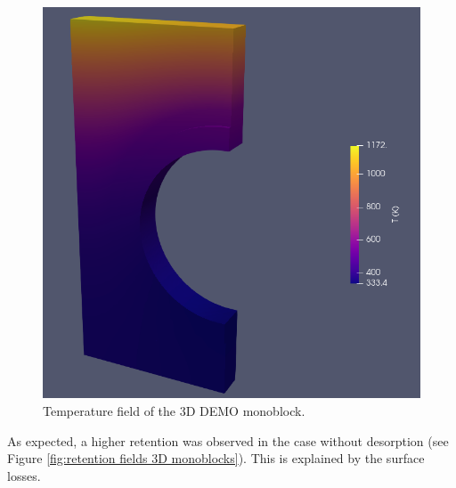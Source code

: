 \begin{figure} [h]
    \centering
    \includegraphics[width=\linewidth]{Figures/Chapter3/monoblocks/3D_monoblocks/temperature_3D_monoblock.png}
    \caption{Temperature field of the 3D DEMO monoblock.}
    \label{fig: T field 3D monoblock}
\end{figure}


As expected, a higher retention was observed in the case without desorption (see Figure \ref{fig:retention fields 3D monoblocks}).
This is explained by the surface losses.

